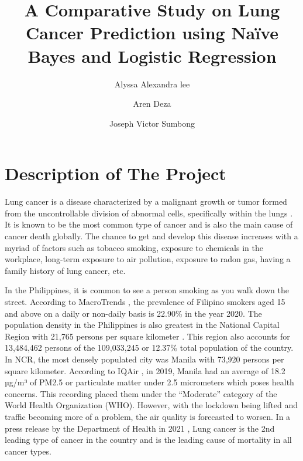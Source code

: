 \documentclass[runningheads]{llncs}
\begin{document}
\title{\textbf{\LARGE A Comparative Study on Lung Cancer Prediction using Naïve Bayes and Logistic Regression}}

\author{Alyssa Alexandra lee\and Aren Deza\and Joseph Victor Sumbong}
\maketitle


\section{Description of The Project}
Lung cancer is a disease characterized by a malignant growth or tumor formed from the uncontrollable division of abnormal cells, specifically within the lungs \cite{cancerResearchUK2019}. It is known to be the most common type of cancer and is also the main cause of cancer death globally. The chance to get and develop this disease increases with a myriad of factors such as tobacco smoking, exposure to chemicals in the workplace, long-term exposure to air pollution, exposure to radon gas, having a family history of lung cancer, etc.

In the Philippines, it is common to see a person smoking as you walk down the street. According to MacroTrends \cite{macrotrends2022}, the prevalence of Filipino smokers aged 15 and above on a daily or non-daily basis is 22.90\% in the year 2020. The population density in the Philippines is also greatest in the National Capital Region with 21,765 persons per square kilometer \cite{philippinestatisticsauthority2021}. This region also accounts for 13,484,462 persons of the 109,033,245 or 12.37\% total population of the country. In NCR, the most densely populated city was Manila with 73,920 persons per square kilometer. According to IQAir \cite{IQAir2022}, in 2019, Manila had an average of 18.2 µg/m³ of PM2.5 or particulate matter under 2.5 micrometers which poses health concerns. This recording placed them under the “Moderate” category of the World Health Organization (WHO). However, with the lockdown being lifted and traffic becoming more of a problem, the air quality is forecasted to worsen. In a press release by the  Department of Health in 2021 \cite{doh2021}, Lung cancer is the 2nd leading type of cancer in the country and is the leading cause of mortality in all cancer types.
\end{document}
